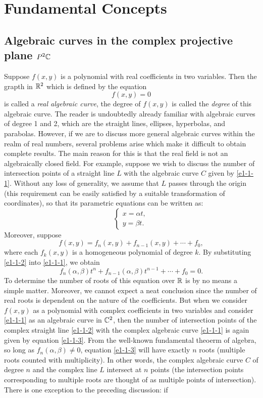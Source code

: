 \chapter{Fundamental Concepts}\label{c1}
\section{Algebraic curves in the complex projective plane \texorpdfstring{$P^2\mathbb{C}$}{P2C}}\label{s1-1}
Suppose $f(x,y)$ is a polynomial with real coefficients in two variables. Then the grapth in $\mathbb{R}^2$ which is defined by the equation 
\begin{equation}\label{e1-1-1}
    f(x,y)=0
\end{equation}
is called a \textit{real algebraic curve}, the degree of $f(x,y)$ is called the \textit{degree} of this algebraic curve. The reader is undoubtedly already familiar with algebraic curves of degree 1 and 2, which are the straight lines, ellipses, hyperbolas, and parabolas. However, if we are to discuss more general algebraic curves within the realm of real numbers, several problems arise which make it difficult to obtain complete results. The main reason for this is that the real field is not an algebraically closed field. For example, suppose we wish to discuss the number of intersection points of a straight line $L$ with the algebraic curve $C$ given by \eqref{e1-1-1}. Without any loss of generality, we assume that $L$ passes through the origin (this requirement can be easily satisfied by a suitable transformation of coordinates), so that its parametric equations can be written as: 
\begin{equation}\label{e1-1-2}
    \begin{cases}
        x=\alpha t, \\
        y=\beta t. 
    \end{cases}
\end{equation}
Moreover, suppose 
\[f(x,y)=f_n(x,y)+f_{n-1}(x,y)+\cdots+f_0, \]
where each $f_k(x,y)$ is a homogeneous polynomial of degree $k$. By substituting \eqref{e1-1-2} into \eqref{e1-1-1}, we obtain 
\begin{equation}\label{e1-1-3}
    f_n(\alpha,\beta)t^n+f_{n-1}(\alpha,\beta)t^{n-1}+\cdots+f_0=0. 
\end{equation}
To determine the number of roots of this equation over $\mathbb{R}$ is by no means a simple matter. Moreover, we cannot expect a neat conclusion since the number of real roots is dependent on the nature of the coefficients. But when we consider $f(x,y)$ as a polynomial with complex coefficients in two variables and consider \eqref{e1-1-1} as an algebraic curve in $\mathbb{C}^2$, then the number of intersection points of the complex straight line \eqref{e1-1-2} with the complex algebraic curve \eqref{e1-1-1} is again given by equation \eqref{e1-1-3}. From the well-known fundamental theoerm of algebra, so long as $f_n(\alpha,\beta)\neq0$, equation \eqref{e1-1-3} will have exactly $n$ roots (multiple roots counted with multiplicity). In other words, the complex algebraic curve $C$ of degree $n$ and the complex line $L$ intersect at $n$ points (the intersection points corresponding to multiple roots are thought of as multiple points of intersection). There is one exception to the preceding discussion: if 
